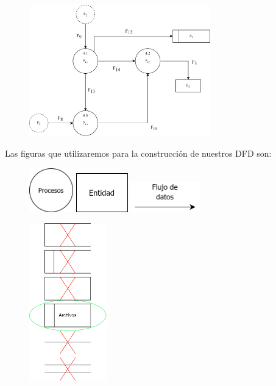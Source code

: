 \documentclass{templateNote}
\begin{document}
\begin{itemize}
    \begin{figure}[H]
        \centering
        \includegraphics[width=0.7\textwidth]{img/Detallado.png}
    \end{figure}
\end{itemize}
Las figuras que utilizaremos para la construcción de nuestros DFD son:
\begin{figure}[H]
    \centering
    \includegraphics[width=0.17\textwidth]{img/procesos.png}\hspace{2.5cm}
    \includegraphics[width=0.20\textwidth]{img/entidad.png}\hspace{2cm}
    \includegraphics[width=0.27\textwidth]{img/flujo.png}\hspace{2.5cm}
\end{figure}
\begin{figure}[H]
    \centering
    \includegraphics[width=0.30\textwidth]{img/archivos.png}
\end{figure}
\end{document}
